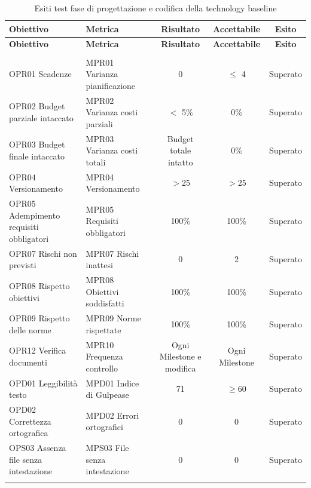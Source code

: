 \documentclass[../piano_di_qualifica.tex]{subfiles}
\begin{document}
\begin{center}
	\begin{longtable}{|p{4cm}|p{4cm}|c|c|c|}
		\hline
		\rowcolor{lightgray}
		\textbf{Obiettivo}                    & \textbf{Metrica}              & \textbf{Risultato}        & \textbf{Accettabile} & \textbf{Esito} \\
		\hline
		\endfirsthead

		\hline
		\rowcolor{lightgray}
		\textbf{Obiettivo}                    & \textbf{Metrica}              & \textbf{Risultato}        & \textbf{Accettabile} & \textbf{Esito} \\
		\hline
		\endhead

		\hline
		\rowcolor{white}
		\multicolumn{5}{|c|}{\emph{Continua alla pagina successiva...}} \\
		\hline
		\endfoot
		\endlastfoot
		OPR01 Scadenze                          & MPR01 Varianza pianificazione & 0                         & $\leq$ 4             & Superato       \\
		OPR02 Budget parziale intaccato         & MPR02 Varianza costi parziali & $<$ 5\%                   & 0\%                  & Superato       \\
		OPR03 Budget finale intaccato           & MPR03 Varianza costi totali   & Budget totale intatto     & 0\%                  & Superato       \\
		OPR04 Versionamento                     & MPR04 Versionamento           & $>$25                     & $>$25                & Superato       \\
		OPR05 Adempimento requisiti obbligatori & MPR05 Requisiti obbligatori   & 100\%                     & 100\%                & Superato       \\
		OPR07 Rischi non previsti               & MPR07 Rischi inattesi         & 0                         & 2                    & Superato       \\
		OPR08 Rispetto obiettivi                & MPR08 Obiettivi soddisfatti   & 100\%                     & 100\%                & Superato       \\
		OPR09 Rispetto delle norme              & MPR09 Norme rispettate        & 100\%                     & 100\%                & Superato       \\
		OPR12 Verifica documenti                & MPR10 Frequenza controllo     & Ogni Milestone e modifica & Ogni Milestone       & Superato       \\
		OPD01 Leggibilità testo                 & MPD01 Indice di Gulpease      & 71                        & \(\ge 60\)           & Superato       \\
		OPD02 Correttezza ortografica           & MPD02 Errori ortografici      & 0                         & 0                    & Superato       \\
		OPS03 Assenza file senza intestazione   & MPS03 File senza intestazione & 0                         & 0                    & Superato       \\
		\hline
		\rowcolor{white}
	\caption{Esiti test fase di progettazione e codifica della technology baseline}
\end{longtable}
\end{center}
\end{document}
